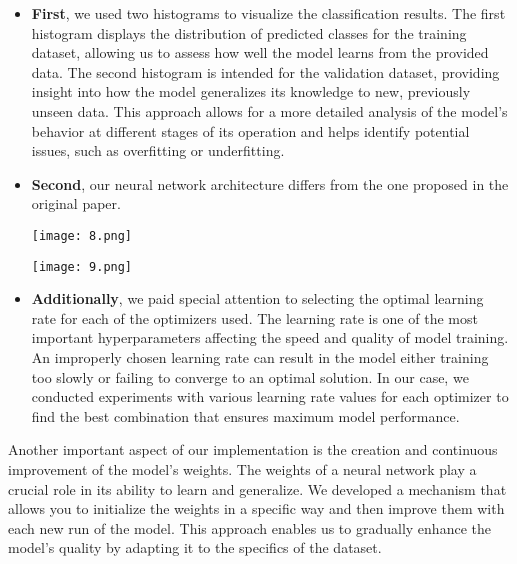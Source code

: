 \documentclass[journal,onecolumn]{IEEEtran}
\begin{document}
\begin{itemize}
    \item \textbf{First}, we used two histograms to visualize the classification results. The first histogram displays the distribution of predicted classes for the training dataset, allowing us to assess how well the model learns from the provided data. The second histogram is intended for the validation dataset, providing insight into how the model generalizes its knowledge to new, previously unseen data. This approach allows for a more detailed analysis of the model's behavior at different stages of its operation and helps identify potential issues, such as overfitting or underfitting.  

    \item \textbf{Second}, our neural network architecture differs from the one proposed in the original paper. 
    \\
    \begin{center}
    \begin{minipage}{0.7\textwidth}
        \centering
        \texttt{[image: 8.png]}
    \end{minipage}

    \vspace{2em} %

    \begin{minipage}{0.7\textwidth}
        \centering
        \texttt{[image: 9.png]}
    \end{minipage}
\end{center}
    

    \item \textbf{Additionally}, we paid special attention to selecting the optimal learning rate for each of the optimizers used. The learning rate is one of the most important hyperparameters affecting the speed and quality of model training. An improperly chosen learning rate can result in the model either training too slowly or failing to converge to an optimal solution. In our case, we conducted experiments with various learning rate values for each optimizer to find the best combination that ensures maximum model performance.  
\end{itemize}

Another important aspect of our implementation is the creation and continuous improvement of the model's weights. The weights of a neural network play a crucial role in its ability to learn and generalize. We developed a mechanism that allows you to initialize the weights in a specific way and then improve them with each new run of the model. This approach enables us to gradually enhance the model's quality by adapting it to the specifics of the dataset.
\end{document}
